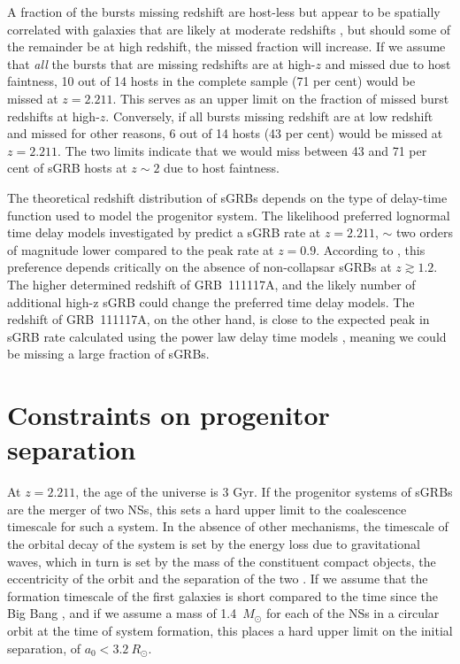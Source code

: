 \documentclass{aa}    %
\begin{document}
A fraction of the bursts missing redshift are host-less but appear to be
spatially correlated with galaxies that are likely at moderate redshifts
\citep{Tunnicliffe2014}, but should some of the remainder be at high redshift,
the missed fraction will increase. If we assume that \textit{all} the bursts
that are missing redshifts are at high-$z$ and missed due to host faintness, 10
out of 14 hosts in the complete sample (71 per cent) would be missed at $z =
2.211$. This serves as an upper limit on the fraction of missed burst redshifts
at high-$z$. Conversely, if all bursts missing redshift are at low redshift and
missed for other reasons, 6 out of 14 hosts (43 per cent) would be missed at $z
= 2.211$. The two limits indicate that we would miss between 43 and 71 per cent
of sGRB hosts at $z \sim 2$ due to host faintness.

The theoretical redshift distribution of sGRBs depends on the type of delay-time
function used to model the progenitor system. The likelihood preferred lognormal
time delay models investigated by \citet{Wanderman2015} predict a sGRB rate at
$z = 2.211$, $\sim$ two orders of magnitude lower compared to the peak rate at
$z = 0.9$. According to \citet{Wanderman2015}, this preference depends
critically on the absence of non-collapsar sGRBs at $z \gtrsim 1.2$. The higher
determined redshift of GRB~111117A, and the likely number of additional high-z
sGRB could change the preferred time delay models. The redshift of GRB~111117A,
on the other hand, is close to the expected peak in sGRB rate calculated using
the power law delay time models \citep{Behroozi2014, Wanderman2015,
	Ghirlanda2016}, meaning we could be missing a large fraction of sGRBs.


\section{Constraints on progenitor separation}

At $z = 2.211$, the age of the universe is 3 Gyr. If the progenitor systems of
sGRBs are the merger of two NSs, this sets a hard upper limit to the coalescence
timescale for such a system. In the absence of other mechanisms, the timescale
of the orbital decay of the system is set by the energy loss due to
gravitational waves, which in turn is set by the mass of the constituent compact
objects, the eccentricity of the orbit and the separation of the two \citep{Postnov2014}. If we assume that the
formation timescale of the first galaxies is short compared to the time since
the Big Bang \citep{Richard2011}, and if we assume a mass of 1.4~$M_\odot$ for
each of the NSs in a circular orbit at the time of system formation, this places
a hard upper limit on the initial separation, of $a_0 < 3.2~R_\odot$.
\end{document}
